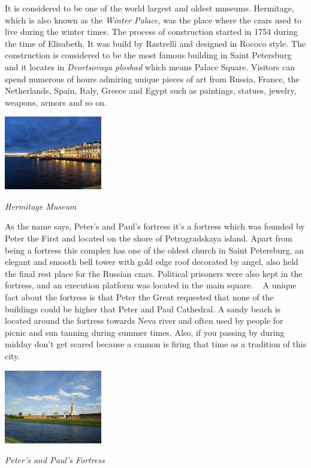 \documentclass[10pt,a4paper]{article} %
\begin{document}
\begin{multicols}{3}
It is considered to be one of the world largest and oldest museums. 
Hermitage, which is also known as the \textit{Winter Palace}, 
was the place where the czars used to live during the winter times. 
The process of construction started in 1754 during the time of Elisabeth. 
It was build by Rastrelli and designed in Rococo style. 
The construction is considered to be the most famous building in Saint Petersburg 
and it locates in \textit{Dvortsovaya ploshad} which means Palace Square. 
Visitors can spend numerous of hours admiring unique pieces of art from Russia, France, 
the Netherlands, Spain, Italy, Greece and Egypt such as paintings, statues, 
jewelry, weapons, armors and so on.

\begin{center}
\includegraphics[width=0.32\textwidth]{media/hermitage.jpg}
\par\textit{Hermitage Museum}
\end{center}

As the name says, Peter's and Paul's fortress it's a fortress which was founded 
by Peter the First and located on the shore of Petrogradskaya island. 
Apart from being a fortress this complex has one of the oldest church in Saint Petersburg, 
an elegant and smooth bell tower with gold edge roof decorated by angel, 
also held the final rest place for the Russian czars. 
Political prisoners were also kept in the fortress, and an execution platform was 
located in the main square.  
A unique fact about the fortress is that Peter the Great requested that 
none of the buildings could be higher that Peter and Paul Cathedral. 
A sandy beach is located around the fortress towards Neva river and often used by people 
for picnic and sun tanning during summer times. 
Also, if you passing by during midday don't get scared because a cannon is firing 
that time as a tradition of this city.

\begin{center}
	\includegraphics[width=0.32\textwidth]{media/peter_and_paul_fortress.jpg}
	\par\textit{Peter's and Paul's Fortress}
\end{center}


\end{multicols}
\end{document}
